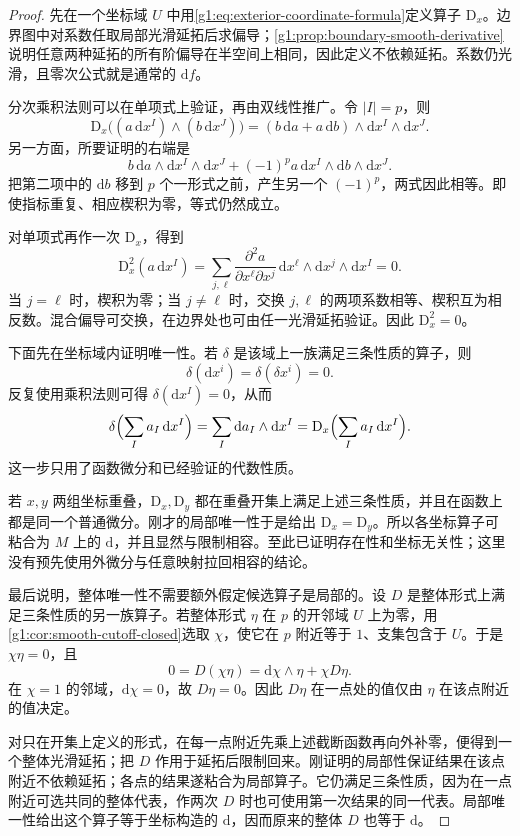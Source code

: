 \begin{proof}
	先在一个坐标域 \(U\) 中用\eqref{g1:eq:exterior-coordinate-formula}定义算子 \(\mathrm{D}_x\)。边界图中对系数任取局部光滑延拓后求偏导；\cref{g1:prop:boundary-smooth-derivative}说明任意两种延拓的所有阶偏导在半空间上相同，因此定义不依赖延拓。系数仍光滑，且零次公式就是通常的 \(\mathrm{d}f\)。

	分次乘积法则可以在单项式上验证，再由双线性推广。令 \(|I|=p\)，则
	\[
		\mathrm{D}_x\bigl((a\,\mathrm{d}x^I)\wedge(b\,\mathrm{d}x^J)\bigr)
		=(b\,\mathrm{d}a+a\,\mathrm{d}b)\wedge\mathrm{d}x^I\wedge\mathrm{d}x^J.
	\]
	另一方面，所要证明的右端是
	\[
		b\,\mathrm{d}a\wedge\mathrm{d}x^I\wedge\mathrm{d}x^J
		+(-1)^p a\,\mathrm{d}x^I\wedge\mathrm{d}b\wedge\mathrm{d}x^J.
	\]
	把第二项中的 \(\mathrm{d}b\) 移到 \(p\) 个一形式之前，产生另一个 \((-1)^p\)，两式因此相等。即使指标重复、相应楔积为零，等式仍然成立。

	对单项式再作一次 \(\mathrm{D}_x\)，得到
	\[
		\mathrm{D}_x^2(a\,\mathrm{d}x^I)
		=\sum_{j,\ell}\frac{\partial^2a}{\partial x^\ell\partial x^j}\,\mathrm{d}x^\ell\wedge\mathrm{d}x^j\wedge\mathrm{d}x^I=0.
	\]
	当 \(j=\ell\) 时，楔积为零；当 \(j\ne\ell\) 时，交换 \(j,\ell\) 的两项系数相等、楔积互为相反数。混合偏导可交换，在边界处也可由任一光滑延拓验证。因此 \(\mathrm{D}_x^2=0\)。

	下面先在坐标域内证明唯一性。若 \(\delta\) 是该域上一族满足三条性质的算子，则
	\[
		\delta(\mathrm{d}x^i)=\delta(\delta x^i)=0.
	\]
	反复使用乘积法则可得 \(\delta(\mathrm{d}x^I)=0\)，从而
	\[
		\delta\Bigl(\sum_I a_I\,\mathrm{d}x^I\Bigr)=\sum_I\mathrm{d}a_I\wedge\mathrm{d}x^I=\mathrm{D}_x\Bigl(\sum_I a_I\,\mathrm{d}x^I\Bigr).
	\]
	这一步只用了函数微分和已经验证的代数性质。

	若 \(x,y\) 两组坐标重叠，\(\mathrm{D}_x,\mathrm{D}_y\) 都在重叠开集上满足上述三条性质，并且在函数上都是同一个普通微分。刚才的局部唯一性于是给出 \(\mathrm{D}_x=\mathrm{D}_y\)。所以各坐标算子可粘合为 \(M\) 上的 \(\mathrm{d}\)，并且显然与限制相容。至此已证明存在性和坐标无关性；这里没有预先使用外微分与任意映射拉回相容的结论。

	最后说明，整体唯一性不需要额外假定候选算子是局部的。设 \(D\) 是整体形式上满足三条性质的另一族算子。若整体形式 \(\eta\) 在 \(p\) 的开邻域 \(U\) 上为零，用\cref{g1:cor:smooth-cutoff-closed}选取 \(\chi\)，使它在 \(p\) 附近等于 \(1\)、支集包含于 \(U\)。于是 \(\chi\eta=0\)，且
	\[
		0=D(\chi\eta)=\mathrm{d}\chi\wedge\eta+\chi D\eta.
	\]
	在 \(\chi=1\) 的邻域，\(\mathrm{d}\chi=0\)，故 \(D\eta=0\)。因此 \(D\eta\) 在一点处的值仅由 \(\eta\) 在该点附近的值决定。

	对只在开集上定义的形式，在每一点附近先乘上述截断函数再向外补零，便得到一个整体光滑延拓；把 \(D\) 作用于延拓后限制回来。刚证明的局部性保证结果在该点附近不依赖延拓；各点的结果遂粘合为局部算子。它仍满足三条性质，因为在一点附近可选共同的整体代表，作两次 \(D\) 时也可使用第一次结果的同一代表。局部唯一性给出这个算子等于坐标构造的 \(\mathrm{d}\)，因而原来的整体 \(D\) 也等于 \(\mathrm{d}\)。
\end{proof}

